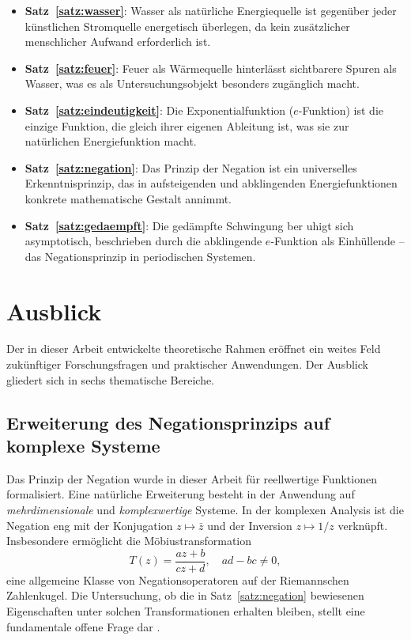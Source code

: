 ﻿\documentclass[a4paper,12pt]{article}
\theoremstyle{definition}
\begin{document}
\begin{itemize}
    \item \textbf{Satz~\ref{satz:wasser}}: Wasser als nat\"urliche Energiequelle ist
          gegen\"uber jeder k\"unstlichen Stromquelle energetisch \"uberlegen, da kein
          zus\"atzlicher menschlicher Aufwand erforderlich ist.
    \item \textbf{Satz~\ref{satz:feuer}}: Feuer als W\"armequelle hinterl\"asst
          sichtbarere Spuren als Wasser, was es als Untersuchungsobjekt besonders
          zug\"anglich macht.
    \item \textbf{Satz~\ref{satz:eindeutigkeit}}: Die Exponentialfunktion ($e$-Funktion)
          ist die einzige Funktion, die gleich ihrer eigenen Ableitung ist, was sie
          zur nat\"urlichen Energiefunktion macht.
    \item \textbf{Satz~\ref{satz:negation}}: Das Prinzip der Negation ist ein
          universelles Erkenntnisprinzip, das in aufsteigenden und abklingenden
          Energiefunktionen konkrete mathematische Gestalt annimmt.
    \item \textbf{Satz~\ref{satz:gedaempft}}: Die ged\"ampfte Schwingung ber uhigt
          sich asymptotisch, beschrieben durch die abklingende $e$-Funktion als
          Einhüllende -- das Negationsprinzip in periodischen Systemen.
\end{itemize}

\section{Ausblick}
\label{sec:ausblick}

Der in dieser Arbeit entwickelte theoretische Rahmen er\"offnet ein weites Feld
zuk\"unftiger Forschungsfragen und praktischer Anwendungen. Der Ausblick gliedert
sich in sechs thematische Bereiche.

\subsection{Erweiterung des Negationsprinzips auf komplexe Systeme}

Das Prinzip der Negation wurde in dieser Arbeit f\"ur reellwertige Funktionen
formalisiert. Eine nat\"urliche Erweiterung besteht in der Anwendung auf
\emph{mehrdimensionale} und \emph{komplexwertige} Systeme. In der komplexen
Analysis ist die Negation eng mit der Konjugation $z \mapsto \bar{z}$ und der
Inversion $z \mapsto 1/z$ verkn\"upft. Insbesondere erm\"oglicht die M\"obiustransformation
\[
    T(z) = \frac{az + b}{cz + d}, \quad ad - bc \neq 0,
\]
eine allgemeine Klasse von Negationsoperatoren auf der Riemannschen Zahlenkugel.
Die Untersuchung, ob die in Satz~\ref{satz:negation} bewiesenen Eigenschaften
unter solchen Transformationen erhalten bleiben, stellt eine fundamentale offene
Frage dar \cite{Needham1997}.
\end{document}
